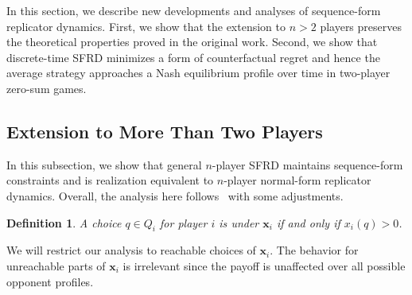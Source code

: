 \documentclass{aamas2014}
\newcommand{\bx}{\mathbf{x}}
\newcommand{\defword}[1]{\textbf{\boldmath{#1}}}
\newtheorem{definition}{Definition}
\begin{document}
In this section, we describe new developments and analyses of sequence-form replicator dynamics. 
First, we show that the extension to $n > 2$ players preserves the theoretical properties proved in the original work. 
Second, we show that discrete-time SFRD minimizes a form of counterfactual regret and hence the average strategy 
approaches a Nash equilibrium profile over time in two-player zero-sum games. 


\subsection{Extension to More Than Two Players}

In this subsection, we show that general $n$-player SFRD maintains sequence-form constraints and is 
realization equivalent to $n$-player normal-form replicator dynamics. Overall, the analysis here follows~\cite{Gatti13Efficient}
with some adjustments. 

\begin{definition}
A choice $q \in Q_i$ for player $i$ is \defword{reachable} under $\bx_i$ if and only if $x_i(q) > 0$. 
\end{definition}

We will restrict our analysis to reachable choices of $\bx_i$. The behavior for unreachable parts of $\bx_i$ is 
irrelevant since the payoff is unaffected over all possible opponent profiles. 
\end{document}
